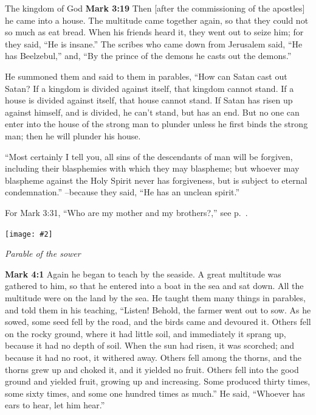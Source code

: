 \documentclass[10pt,twoside]{article} %
\newcommand{\fig}[2][0.4]{
    \ifthenelse{\isodd{\pageref{fig:#2}}}{}{\hfill}
    \texttt{[image: \#2]}\label{fig:#2}
    \ifthenelse{\isodd{\pageref{fig:#2}}}{\hfill}{}
    \par
}
\newcommand{\quotesize}{\normalsize{}}
\newcommand{\comm}[1]{\begingroup \color{black!50} #1\endgroup}
\newenvironment{quotetext}{\begingroup\quotesize}{\endgroup}
\newcommand{\bible}[2]{\begin{quotetext}\textbf{#1} #2\end{quotetext}}
\newcommand{\gospelmark}[2]{\bible{Mark #1}{#2}}
\newcommand{\subhead}[1]{\emph{#1}\par}
\begin{document}
\begin{section}{The kingdom of God}
\gospelmark{3:19}{
Then [after the commissioning of the apostles] he came into a house.   The multitude came together again, so that they could not so much as eat bread.   When his friends heard it, they went out to seize him; for they said, ``He is insane.''   The scribes who came down from Jerusalem said, ``He has Beelzebul,'' and, ``By the prince of the demons he casts out the demons.''

  He summoned them and said to them in parables, ``How can Satan cast out Satan?    If a kingdom is divided against itself, that kingdom cannot stand.    If a house is divided against itself, that house cannot stand.    If Satan has risen up against himself, and is divided, he can't stand, but has an end.    But no one can enter into the house of the strong man to plunder unless he first binds the strong man; then he will plunder his house.

   ``Most certainly I tell you, all sins of the descendants of man will be forgiven, including their blasphemies with which they may blaspheme;    but whoever may blaspheme against the Holy Spirit never has forgiveness, but is subject to eternal condemnation.''   --because they said, ``He has an unclean spirit.''\label{how-can-satan}
}

\comm{For Mark 3:31, ``Who are my mother and my brothers?,'' see p.~\pageref{who-are-my-mother-and-my-brothers}.}

\fig{sower}

\subhead{Parable of the sower}

\gospelmark{4:1}{
   Again he began to teach by the seaside. A great multitude was gathered to him, so that he entered into a boat in the sea and sat down. All the multitude were on the land by the sea.   He taught them many things in parables, and told them in his teaching,    ``Listen! Behold, the farmer went out to sow.    As he sowed, some seed fell by the road, and the birds came and devoured it.    Others fell on the rocky ground, where it had little soil, and immediately it sprang up, because it had no depth of soil.    When the sun had risen, it was scorched; and because it had no root, it withered away.    Others fell among the thorns, and the thorns grew up and choked it, and it yielded no fruit.    Others fell into the good ground and yielded fruit, growing up and increasing. Some produced thirty times, some sixty times, and some one hundred times as much.''   He said, ``Whoever has ears to hear, let him hear.''

}
\end{section}
\end{document}
